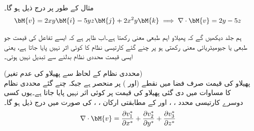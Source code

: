 مثال کے طور پر  درج ذیل ہو گا۔
\begin{align*}
\bM{v}=2xy\bM{i}-5yz\bM{j}+2x^2y\bM{k}\implies \nabla \cdot \bM{v}=2y-5z
\end{align*}

ہم جلد دیکھیں گے کہ پھیلاو اہم طبعی معنی  رکھتا ہے۔اب ظاہر ہے کہ ایسے تفاعل کی قیمت جو طبعی یا جیومیٹریائی معنی رکھتی ہو پر چنے گئے کارتیسی نظام کا کوئی اثر نہیں پایا جاتا ہے، یعنی ایسی قیمت محددی نظام بدلنے سے تبدیل نہیں ہوتی۔ 

\quad (محددی نظام کے لحاظ سے پھیلاو کی عدم تغیر) \\
پھیلاو  کی قیمت صرف فضا میں نقطے  (اور ) پر منحصر ہے جبکہ چنے گئے محددی نظام کا مساوات  میں دی گئی پھیلاو کی قیمت پر کوئی اثر نہیں پایا جاتا ہے۔یوں کسی دوسرے کارتیسی محدد ، ،  اور  کے مطابقتی ارکان ، ،  کی صورت میں  درج ذیل ہو گا۔
\begin{align}\label{مساوات_الاحصاء_پھیلاو_تعریف_ب}
\nabla \cdot \bM{v}=\frac{\partial v_1^*}{\partial x^*}+\frac{\partial v_2^*}{\partial y^*}+\frac{\partial v_3^*}{\partial z^*}
\end{align}

